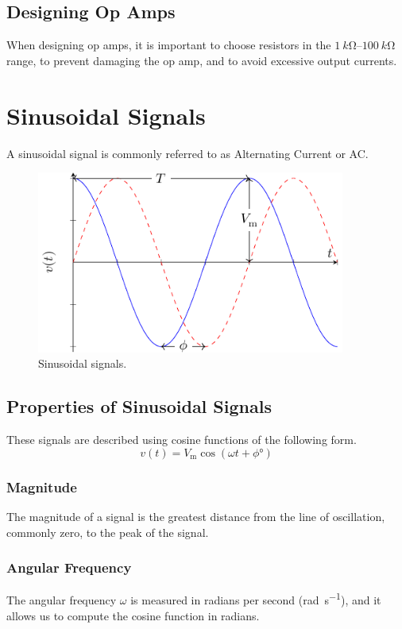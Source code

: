 \documentclass{article}
\begin{document}
\subsection{Designing Op Amps}
When designing op amps, it is important to choose resistors in the
\(\qtyrange{1}{100}{k\ohm}\) range, to prevent damaging the op amp, and
to avoid excessive output currents. \newpage
\section{Sinusoidal Signals}
\begin{definition}
    A sinusoidal signal is commonly referred to as Alternating Current or AC\@.
\end{definition}
\begin{figure}[H]
    \centering
    \includegraphics[height = 6cm, keepaspectratio = true]{figures/sinusoidal_signal.pdf}
    \caption{Sinusoidal signals.}
\end{figure}
\subsection{Properties of Sinusoidal Signals}
These signals are described using cosine functions of the following
form.
\begin{equation*}
    v(t) = V_{\mathrm{m}} \cos{\left( \omega t + \phi\unit{\degree} \right)}
\end{equation*}
\subsubsection{Magnitude}
\begin{definition}
    The magnitude of a signal is the greatest distance from the line of oscillation, commonly zero,
    to the peak of the signal.
\end{definition}
\subsubsection{Angular Frequency}
\begin{definition}
    The angular frequency \(\omega\) is measured in radians per second (\unit{\radian.\second^{-1}}), and it allows
    us to compute the cosine function in radians.
\end{definition}
\end{document}
